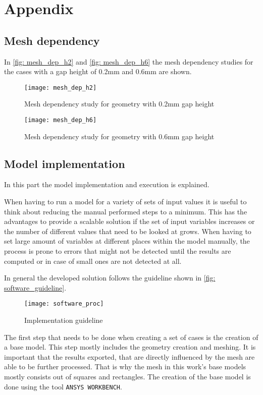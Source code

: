 \documentclass[../thesis.tex]{subfiles}
\begin{document}
\chapter{Appendix}


\section{Mesh dependency}
\label{chp: app_meshdep}
In \autoref{fig: mesh_dep_h2} and \autoref{fig: mesh_dep_h6} the mesh dependency studies for the cases with a gap height of 0.2mm and 0.6mm are shown.
\begin{figure}[htb]
	\centering
	\texttt{[image: mesh\_dep\_h2]}
	\caption{Mesh dependency study for geometry with 0.2mm gap height}
	\label{fig: mesh_dep_h2}
\end{figure}

\begin{figure}[htb]
	\centering
	\texttt{[image: mesh\_dep\_h6]}
	\caption{Mesh dependency study for geometry with 0.6mm gap height}
	\label{fig: mesh_dep_h6}
\end{figure}

\section{Model implementation}
\label{sec: app_modimp}

In this part the model implementation and execution is explained.

When having to run a model for a variety of sets of input values it is useful to think about reducing the manual performed steps to a minimum. This has the advantages to provide a scalable solution if the set of input variables increases or the number of different values that need to be looked at grows. When having to set large amount of variables at different places within the model manually, the process is prone to errors that might not be detected until the results are computed or in case of small ones are not detected at all.

In general the developed solution follows the guideline shown in \autoref{fig: software_guideline}.

\begin{figure}[htbp]
	\centering
	\texttt{[image: software\_proc]}
	\caption{Implementation guideline}
	\label{fig: software_guideline}
\end{figure}

The first step that needs to be done when creating a set of cases is the creation of a base model. This step mostly includes the geometry creation and meshing. It is important that the results exported, that are directly influenced by the mesh are able to be further processed. That is why the mesh in this work's base models mostly consists out of squares and rectangles. The creation of the base model is done using the tool \texttt{ANSYS WORKBENCH}.
\end{document}
